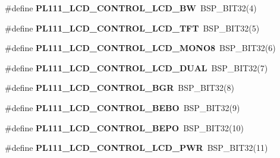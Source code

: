 \begin{DoxyCompactItemize}
\item 
\mbox{\label{arm-pl111-regs_8h_a4d1ce066cd6d2384ebfadd940caad0b3}} 
\#define {\bfseries P\+L111\+\_\+\+L\+C\+D\+\_\+\+C\+O\+N\+T\+R\+O\+L\+\_\+\+L\+C\+D\+\_\+\+BW}~B\+S\+P\+\_\+\+B\+I\+T32(4)
\item 
\mbox{\label{arm-pl111-regs_8h_a02f890b6c33cc5bafbd842897f5f9514}} 
\#define {\bfseries P\+L111\+\_\+\+L\+C\+D\+\_\+\+C\+O\+N\+T\+R\+O\+L\+\_\+\+L\+C\+D\+\_\+\+T\+FT}~B\+S\+P\+\_\+\+B\+I\+T32(5)
\item 
\mbox{\label{arm-pl111-regs_8h_a9d569622a14febacdc9dc478a9d34f45}} 
\#define {\bfseries P\+L111\+\_\+\+L\+C\+D\+\_\+\+C\+O\+N\+T\+R\+O\+L\+\_\+\+L\+C\+D\+\_\+\+M\+O\+N\+O8}~B\+S\+P\+\_\+\+B\+I\+T32(6)
\item 
\mbox{\label{arm-pl111-regs_8h_aec08ab487eb208d344b0d7673f817d96}} 
\#define {\bfseries P\+L111\+\_\+\+L\+C\+D\+\_\+\+C\+O\+N\+T\+R\+O\+L\+\_\+\+L\+C\+D\+\_\+\+D\+U\+AL}~B\+S\+P\+\_\+\+B\+I\+T32(7)
\item 
\mbox{\label{arm-pl111-regs_8h_a6bef7590dcd712a05e9c6a17fd3fbf7d}} 
\#define {\bfseries P\+L111\+\_\+\+L\+C\+D\+\_\+\+C\+O\+N\+T\+R\+O\+L\+\_\+\+B\+GR}~B\+S\+P\+\_\+\+B\+I\+T32(8)
\item 
\mbox{\label{arm-pl111-regs_8h_a0ac97d1c15a4bb4f45fbe0cb33f65610}} 
\#define {\bfseries P\+L111\+\_\+\+L\+C\+D\+\_\+\+C\+O\+N\+T\+R\+O\+L\+\_\+\+B\+E\+BO}~B\+S\+P\+\_\+\+B\+I\+T32(9)
\item 
\mbox{\label{arm-pl111-regs_8h_ace5d8dbaf393c184e5104133dcfe6787}} 
\#define {\bfseries P\+L111\+\_\+\+L\+C\+D\+\_\+\+C\+O\+N\+T\+R\+O\+L\+\_\+\+B\+E\+PO}~B\+S\+P\+\_\+\+B\+I\+T32(10)
\item 
\mbox{\label{arm-pl111-regs_8h_a015f8d428a3dffb22ef17df6f7ff5c4d}} 
\#define {\bfseries P\+L111\+\_\+\+L\+C\+D\+\_\+\+C\+O\+N\+T\+R\+O\+L\+\_\+\+L\+C\+D\+\_\+\+P\+WR}~B\+S\+P\+\_\+\+B\+I\+T32(11)
\item 
\mbox{\label{arm-pl111-regs_8h_a38703b02b8ade380019f2c1b96b9990a}} 

\end{DoxyCompactItemize}
